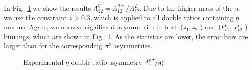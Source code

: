In Fig.~\ref{fig:exp_eta_result} we show the results $A_{12}^{\eta}=A_{12}^{\eta \pm}/A_{12}^L$. Due to the higher mass of the $\eta$, we use the constraint $z> 0.3$, which is applied to all double ratios containing $\eta$ mesons. Again, we observe significant asymmetries in both ($z_1, z_2$ ) and ($P_{t1}$, $P_{t2}$ ) binnings. which are shown in Fig.~\ref{fig:exp_eta_result}. 
As the statistics are lower, the error bars are larger than for the corresponding $\pi^0$ asymmetries. 
\begin{figure}[H]
  \centering     
  \caption{Experimental $\eta$ double ratio asymmetry $\nicefrac{A^{\eta\pm}_1}{A^L_1}$}
  \label{fig:exp_eta_result}
\end{figure}

